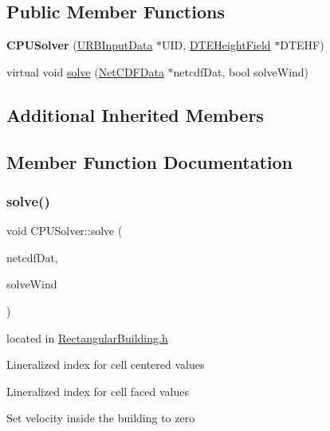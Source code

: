 \subsection*{Public Member Functions}
\begin{DoxyCompactItemize}
\item 
\mbox{\label{classCPUSolver_a681ee9c01d35cff794f31726cf0ec044}} 
{\bfseries C\+P\+U\+Solver} (\hyperlink{classURBInputData}{U\+R\+B\+Input\+Data} $\ast$U\+ID, \hyperlink{classDTEHeightField}{D\+T\+E\+Height\+Field} $\ast$D\+T\+E\+HF)
\item 
virtual void \hyperlink{classCPUSolver_aaf3f4e100bcb96430461c935aaab23d1}{solve} (\hyperlink{classNetCDFData}{Net\+C\+D\+F\+Data} $\ast$netcdf\+Dat, bool solve\+Wind)
\end{DoxyCompactItemize}
\subsection*{Additional Inherited Members}


\subsection{Member Function Documentation}
\mbox{\label{classCPUSolver_aaf3f4e100bcb96430461c935aaab23d1}} 
\subsubsection{\texorpdfstring{solve()}{solve()}}
{\footnotesize\ttfamily void C\+P\+U\+Solver\+::solve (\begin{DoxyParamCaption}\item[{\hyperlink{classNetCDFData}{Net\+C\+D\+F\+Data} $\ast$}]{netcdf\+Dat,  }\item[{bool}]{solve\+Wind }\end{DoxyParamCaption})\hspace{0.3cm}{\ttfamily [virtual]}}

located in \hyperlink{RectangularBuilding_8h_source}{Rectangular\+Building.\+h}

Lineralized index for cell centered values

Lineralized index for cell faced values

Set velocity inside the building to zero

